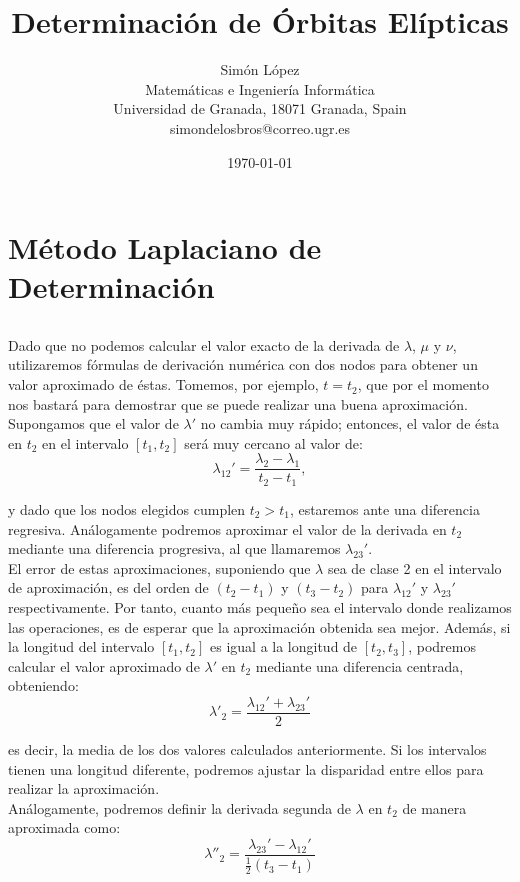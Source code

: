 \documentclass[11pt]{article}
\title{Determinación de Órbitas Elípticas}
\author{Simón López
\\
{\small Matemáticas e Ingeniería Informática}
\\
{\small Universidad de Granada, 18071 Granada, Spain}
\\
{\small simondelosbros@correo.ugr.es}}
\date{\today}
\begin{document}
\section{Método Laplaciano de Determinación}

\subsection{}
\label{subsec:primera_segunda_derivada}
Dado que no podemos calcular el valor exacto de la derivada de $\lambda$, $\mu$ y $\nu$, utilizaremos fórmulas de derivación numérica con dos nodos para obtener un valor aproximado de éstas. Tomemos, por ejemplo, $t=t_2$, que por el momento nos bastará para demostrar que se puede realizar una buena aproximación. Supongamos que el valor de $\lambda'$ no cambia muy rápido; entonces, el valor de ésta en $t_2$ en el intervalo $[t_1,t_2]$ será muy cercano al valor de:
\[
\lambda_{12}'=\frac{\lambda_2-\lambda_1}{t_2-t_1},
\]

\noindent y dado que los nodos elegidos cumplen $t_2>t_1$, estaremos ante una diferencia regresiva. Análogamente podremos aproximar el valor de la derivada en $t_2$ mediante una diferencia progresiva, al que llamaremos $\lambda_{23}'$.\\

El error de estas aproximaciones, suponiendo que $\lambda$ sea de clase 2 en el intervalo de aproximación, es del orden de $(t_2-t_1)$ y $(t_3-t_2)$ para $\lambda_{12}'$ y $\lambda_{23}'$ respectivamente. Por tanto, cuanto más pequeño sea el intervalo donde realizamos las operaciones, es de esperar que la aproximación obtenida sea mejor. Además, si la longitud del intervalo $[t_1,t_2]$ es igual a la longitud de $[t_2,t_3]$, podremos calcular el valor aproximado de $\lambda'$ en $t_2$ mediante una diferencia centrada, obteniendo:
\[
\lambda'_2=\frac{\lambda_{12}'+\lambda_{23}'}{2}
\]

\noindent es decir, la media de los dos valores calculados anteriormente. Si los intervalos tienen una longitud diferente, podremos ajustar la disparidad entre ellos para realizar la aproximación.\\

Análogamente, podremos definir la derivada segunda de $\lambda$ en $t_2$ de manera aproximada como:
\[
\lambda''_2=\frac{\lambda_{23}'-\lambda_{12}'}{\frac{1}{2}(t_3-t_1)}
\]
\end{document}
